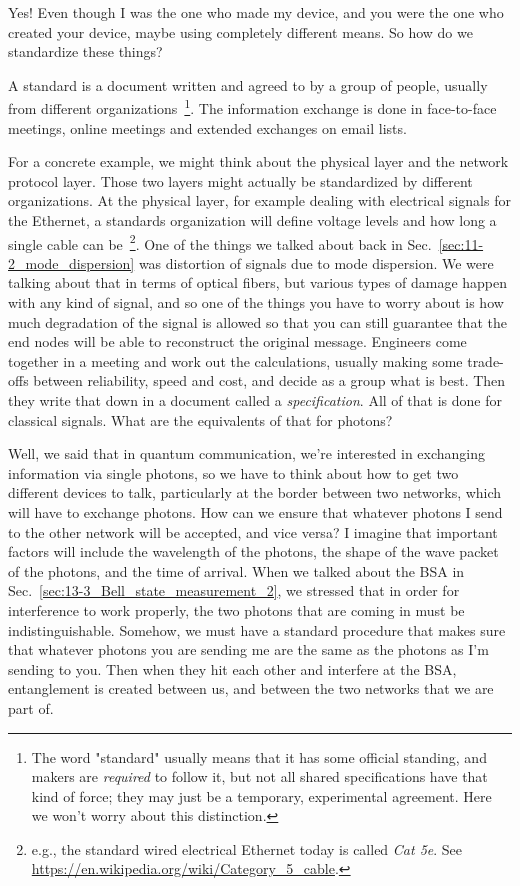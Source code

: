 \mmm Yes! Even though I was the one who made my device, and you were the one who created your device, maybe using completely different means. So how do we standardize these things?

\rrr A standard is a document written and agreed to by a group of people, usually from different organizations~\footnote{The word "standard" usually means that it has some official standing, and makers are \emph{required} to follow it, but not all shared specifications have that kind of force; they may just be a temporary, experimental agreement. Here we won't worry about this distinction.}. The information exchange is done in face-to-face meetings, online meetings and extended exchanges on email lists.

For a concrete example, we might think about the physical layer and the network protocol layer. Those two layers might actually be standardized by different organizations. At the physical layer, for example dealing with electrical signals for the Ethernet, a standards organization will define voltage levels and how long a single cable can be~\footnote{e.g., the standard wired electrical Ethernet today is called \emph{Cat 5e}. See \url{https://en.wikipedia.org/wiki/Category_5_cable}.}. One of the things we talked about back in Sec.~\ref{sec:11-2_mode_dispersion} was distortion of signals due to mode dispersion. We were talking about that in terms of optical fibers, but various types of damage happen with any kind of signal, and so one of the things you have to worry about is how much degradation of the signal is allowed so that you can still guarantee that the end nodes will be able to reconstruct the original message. Engineers come together in a meeting and work out the calculations, usually making some trade-offs between reliability, speed and cost, and decide as a group what is best.  Then they write that down in a document called a \emph{specification}. All of that is done for classical signals. What are the equivalents of that for photons?

\mmm Well, we said that in quantum communication, we're interested in exchanging information via single photons, so we have to think about how to get two different devices to talk, particularly at the border between two networks, which will have to exchange photons. How can we ensure that whatever photons I send to the other network will be accepted, and vice versa? I imagine that important factors will include the wavelength of the photons, the shape of the wave packet of the photons, and the time of arrival. When we talked about the BSA in Sec.~\ref{sec:13-3_Bell_state_measurement_2}, we stressed that in order for interference to work properly, the two photons that are coming in must be indistinguishable. Somehow, we must have a standard procedure that makes sure that whatever photons you are sending me are the same as the photons as I'm sending to you. Then when they hit each other and interfere at the BSA, entanglement is created between us, and between the two networks that we are part of.


